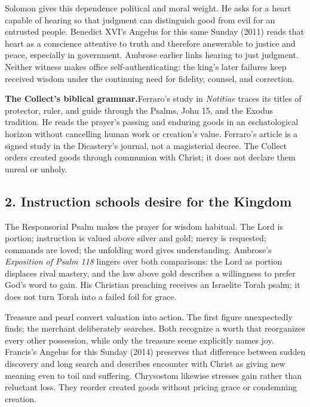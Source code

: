 {Solomon gives this dependence political and moral weight. He asks for a heart capable of hearing so that judgment can distinguish good from evil for an entrusted people. Benedict XVI's Angelus for this same Sunday (2011) reads that heart as a conscience attentive to truth and therefore answerable to justice and peace, especially in government. Ambrose earlier links hearing to just judgment. Neither witness makes office self-authenticating: the king's later failures keep received wisdom under the continuing need for fidelity, counsel, and correction.

\noindent\textbf{The Collect's biblical grammar.}\enspace Ferraro's study in \emph{Notitiae} traces its titles of protector, ruler, and guide through the Psalms, John 15, and the Exodus tradition. He reads the prayer's passing and enduring goods in an eschatological horizon without cancelling human work or creation's value. Ferraro's article is a signed study in the Dicastery's journal, not a magisterial decree. The Collect orders created goods through communion with Christ; it does not declare them unreal or unholy.

\subsection*{2. Instruction schools desire for the Kingdom\enspace{}}

The Responsorial Psalm makes the prayer for wisdom habitual. The Lord is portion; instruction is valued above silver and gold; mercy is requested; commands are loved; the unfolding word gives understanding. Ambrose's \emph{Exposition of Psalm 118} lingers over both comparisons: the Lord as portion displaces rival mastery, and the law above gold describes a willingness to prefer God's word to gain. His Christian preaching receives an Israelite Torah psalm; it does not turn Torah into a failed foil for grace.

Treasure and pearl convert valuation into action. The first figure unexpectedly finds; the merchant deliberately searches. Both recognize a worth that reorganizes every other possession, while only the treasure scene explicitly names joy. Francis's Angelus for this Sunday (2014) preserves that difference between sudden discovery and long search and describes encounter with Christ as giving new meaning even to toil and suffering. Chrysostom likewise stresses gain rather than reluctant loss. They reorder created goods without pricing grace or condemning creation.

}
